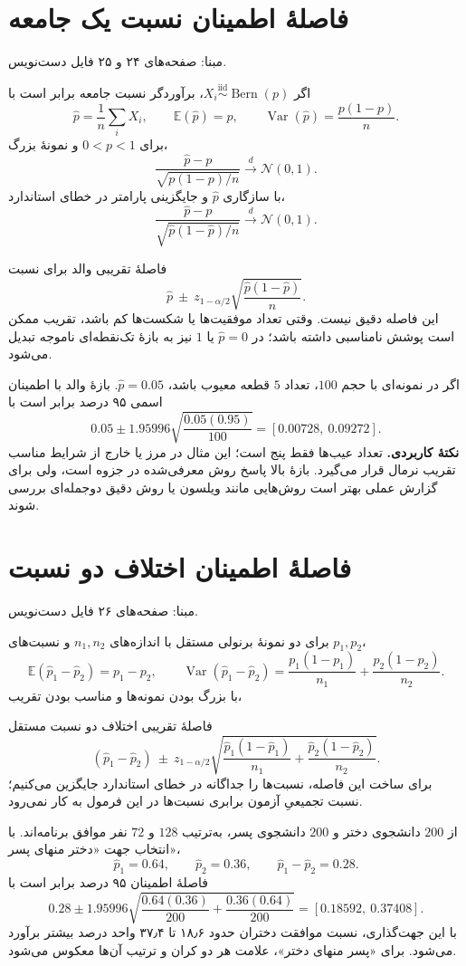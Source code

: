 \documentclass[12pt,a4paper,oneside]{report}
\newcounter{ex}[chapter]
\newenvironment{example}[1]{\refstepcounter{ex}\begin{tcolorbox}[breakable=false,title={مثال \thechapter.\arabic{ex} | #1},colframe=muted,colback=white]}{\end{tcolorbox}}
\newcommand{\source}[1]{\par{\small\color{muted} مبنا: صفحه‌های #1 فایل دست‌نویس.}\par}
\newcommand{\E}{\mathbb E}
\newcommand{\Var}{\operatorname{Var}}
\newcommand{\iid}{\overset{\mathrm{iid}}{\sim}}
\newcommand{\N}{\mathcal N}
\begin{document}
\section{فاصلهٔ اطمینان نسبت یک جامعه}
\source{۲۴ و ۲۵}
اگر $X_i\iid\operatorname{Bern}(p)$، برآوردگر نسبت جامعه برابر است با
\[
\widehat p=\frac1n\sum_iX_i,\qquad
\E(\widehat p)=p,\qquad \Var(\widehat p)=\frac{p(1-p)}n.
\]
برای $0<p<1$ و نمونهٔ بزرگ،
\[
\frac{\widehat p-p}{\sqrt{p(1-p)/n}}\xrightarrow{d}\N(0,1).
\]
با سازگاری $\widehat p$ و جایگزینی پارامتر در خطای استاندارد،
\[
\frac{\widehat p-p}{\sqrt{\widehat p(1-\widehat p)/n}}
\xrightarrow{d}\N(0,1).
\]
\begin{result}{فاصلهٔ تقریبی والد برای نسبت}
\[
\boxed{\widehat p\ \pm\ z_{1-\alpha/2}
\sqrt{\frac{\widehat p(1-\widehat p)}n}.}
\]
این فاصله دقیق نیست. وقتی تعداد موفقیت‌ها یا شکست‌ها کم باشد، تقریب ممکن است پوشش نامناسبی داشته باشد؛ در $\widehat p=0$ یا $1$ نیز به بازهٔ تک‌نقطه‌ای ناموجه تبدیل می‌شود.
\end{result}
\begin{example}{پنج قطعهٔ معیوب از صد قطعه}
اگر در نمونه‌ای با حجم $100$، تعداد $5$ قطعه معیوب باشد، $\widehat p=0.05$. بازهٔ والد با اطمینان اسمی ۹۵ درصد برابر است با
\[
0.05\pm1.95996\sqrt{\frac{0.05(0.95)}{100}}
=\boxed{[0.00728,\ 0.09272]}.
\]
\textbf{نکتهٔ کاربردی.} تعداد عیب‌ها فقط پنج است؛ این مثال در مرز یا خارج از شرایط مناسب تقریب نرمال قرار می‌گیرد. بازهٔ بالا پاسخ روش معرفی‌شده در جزوه است، ولی برای گزارش عملی بهتر است روش‌هایی مانند ویلسون یا روش دقیق دوجمله‌ای بررسی شوند.
\end{example}
\section{فاصلهٔ اطمینان اختلاف دو نسبت}
\source{۲۶}
برای دو نمونهٔ برنولی مستقل با اندازه‌های $n_1,n_2$ و نسبت‌های $p_1,p_2$،
\[
\E(\widehat p_1-\widehat p_2)=p_1-p_2,
\qquad
\Var(\widehat p_1-\widehat p_2)=\frac{p_1(1-p_1)}{n_1}+\frac{p_2(1-p_2)}{n_2}.
\]
با بزرگ بودن نمونه‌ها و مناسب بودن تقریب،
\begin{result}{فاصلهٔ تقریبی اختلاف دو نسبت مستقل}
\[
\boxed{(\widehat p_1-\widehat p_2)\ \pm\ z_{1-\alpha/2}
\sqrt{\frac{\widehat p_1(1-\widehat p_1)}{n_1}
+\frac{\widehat p_2(1-\widehat p_2)}{n_2}}.}
\]
برای ساخت این فاصله، نسبت‌ها را جداگانه در خطای استاندارد جایگزین می‌کنیم؛ نسبت تجمیعیِ آزمون برابری نسبت‌ها در این فرمول به کار نمی‌رود.
\end{result}
\begin{example}{نظر دانشجویان دختر و پسر دربارهٔ یک برنامه}
از $200$ دانشجوی دختر و $200$ دانشجوی پسر، به‌ترتیب $128$ و $72$ نفر موافق برنامه‌اند. با انتخاب جهت «دختر منهای پسر»،
\[
\widehat p_1=0.64,\qquad\widehat p_2=0.36,\qquad
\widehat p_1-\widehat p_2=0.28.
\]
فاصلهٔ اطمینان ۹۵ درصد برابر است با
\[
0.28\pm1.95996\sqrt{\frac{0.64(0.36)}{200}+\frac{0.36(0.64)}{200}}
=\boxed{[0.18592,\ 0.37408]}.
\]
با این جهت‌گذاری، نسبت موافقت دختران حدود ۱۸٫۶ تا ۳۷٫۴ واحد درصد بیشتر برآورد می‌شود. برای «پسر منهای دختر»، علامت هر دو کران و ترتیب آن‌ها معکوس می‌شود.
\end{example}
\end{document}

